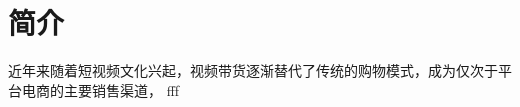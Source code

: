 
\chapter{简介}
近年来随着短视频文化兴起，视频带货逐渐替代了传统的购物模式，成为仅次于平台电商的主要销售渠道\cite{XIXY202410016}，  fff \cite{SYJJ202201019}